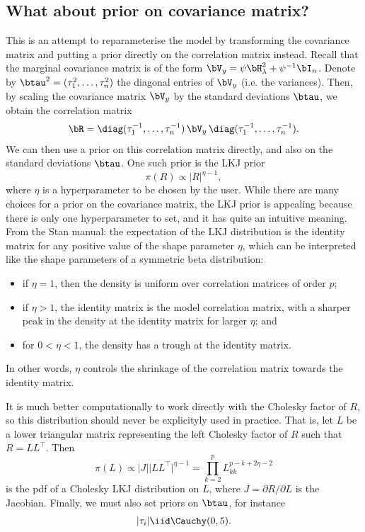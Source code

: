 \documentclass[english, 11pt]{article}
\begin{document}
\subsection{What about prior on covariance matrix?}

This is an attempt to reparameterise the model by transforming the covariance matrix and putting a prior directly on the correlation matrix instead. Recall that the marginal covariance matrix is of the form $\Vy = \psi\Hlam^2 + \psi^{-1}\bI_n$. Denote by $\btau^2 = (\tau_1^2, \dots, \tau_n^2)$ the diagonal entries of $\Vy$ (i.e. the variances). Then, by scaling the covariance matrix $\Vy$ by the standard deviations $\btau$, we obtain the correlation matrix
\[
	\bR = \diag(\tau_1^{-1}, \dots, \tau_n^{-1}) \, \Vy \, \diag(\tau_1^{-1}, \dots, \tau_n^{-1}).
\]
We can then use a prior on this correlation matrix directly, and also on the standard deviations $\btau$. One such prior is the LKJ prior \citep{lewandowski2009generating}
\[
	\pi(R) \propto \vert R \vert ^ {\eta - 1},
\]
where $\eta$ is a hyperparameter to be chosen by the user. While there are many choices for a prior on the covariance matrix, the LKJ prior is appealing because there is only one hyperparameter to set, and it has quite an intuitive meaning. From the Stan manual: the expectation of the LKJ distribution is the identity matrix for any positive value of the shape parameter $\eta$, which can be interpreted like the shape parameters of a symmetric beta distribution:
\begin{itemize}
	\item if $\eta = 1$, then the density is uniform over correlation matrices of order $p$;
	\item if $\eta > 1$, the identity matrix is the model correlation matrix, with a sharper peak in the density at the identity matrix for larger $\eta$; and
	\item for $0 < \eta < 1$, the density has a trough at the identity matrix.
\end{itemize}
In other words, $\eta$ controls the shrinkage of the correlation matrix towards the identity matrix.

It is much better computationally to work directly with the Cholesky factor of $R$, so this distribution should never be explicityly used in practice. That is, let $L$ be a lower triangular matrix representing the left Cholesky factor of $R$ such that $R = LL^\top$. Then 
\[
	\pi(L) \propto \vert J \vert \vert LL^\top \vert ^{\eta - 1} = \prod_{k=2}^p L_{kk}^{p-k+2\eta-2}
\]
is the pdf of a Cholesky LKJ distribution on $L$, where $J = \partial R / \partial L$ is the Jacobian. Finally, we must also set priors on $\btau$, for instance
\[
	|\tau_i| \iid \Cauchy(0, 5).
\]
\end{document}
